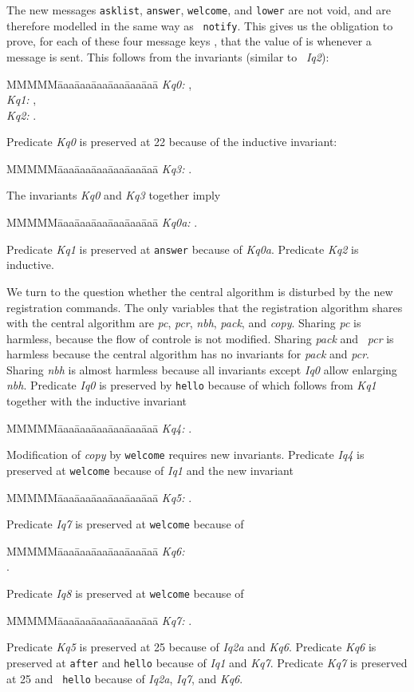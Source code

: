 \documentclass[10pt]{article} \usepackage[english]{babel}
\newenvironment{tab}{\begin{tabbing}
MMMMM\=aaa\=aaa\=aaa\=aaa\=aaa\=aaa\= \kill}{\end{tabbing}}
\def\S #1/{\mbox {\textsl{#1}}}
\def\T #1/{\mbox {\texttt{#1}}}
\begin{document}
The new messages \T asklist/, \T answer/, \T welcome/, and \T lower/
are not void, and are therefore modelled in the same way as \T
notify/.  This gives us the obligation to prove, for each of these
four message keys , that the value of  is  whenever a
message  is sent.  This follows from the invariants (similar to \S
Iq2/):
\begin{tab}
  \S Kq0:/ \>  ,\\
  \S Kq1:/ \>  ,\\
  \S Kq2:/ \>  .
\end{tab}
Predicate \S Kq0/ is preserved at 22 because of the inductive invariant:
\begin{tab}
\S Kq3:/ \>  .
\end{tab}
The invariants \S Kq0/ and \S Kq3/ together imply
\begin{tab}
\S Kq0a:/ \>  .
\end{tab}
Predicate \S Kq1/ is preserved at \T answer/ because of \S Kq0a/.
Predicate \S Kq2/ is inductive.

We turn to the question whether the central algorithm is disturbed by
the new registration commands.  The only variables that the
registration algorithm shares with the central algorithm are \S pc/,
\S pcr/, \S nbh/, \S pack/, and \S copy/.  Sharing \S pc/ is harmless,
because the flow of controle is not modified.  Sharing \S pack/ and \S
pcr/ is harmless because the central algorithm has no invariants for
\S pack/ and \S pcr/.  Sharing \S nbh/ is almost harmless because all
invariants except \S Iq0/ allow enlarging \S nbh/.  Predicate \S Iq0/
is preserved by \T hello/ because of  which follows
from \S Kq1/ together with the inductive invariant
\begin{tab}
  \S Kq4:/ \>  .
\end{tab}

Modification of \S copy/ by \T welcome/ requires new invariants.
Predicate \S Iq4/ is preserved at \T welcome/ because of \S Iq1/ and
the new invariant
\begin{tab}
\S Kq5:/ \>  .
\end{tab}
Predicate \S Iq7/ is preserved at \T welcome/ because of 
\begin{tab}
\S Kq6:/ \>  \\
\>  .
\end{tab}
Predicate \S Iq8/ is preserved at \T welcome/ because of 
\begin{tab}
\S Kq7:/ \>  .
\end{tab}

Predicate \S Kq5/ is preserved at 25 because of \S Iq2a/ and \S Kq6/.
Predicate \S Kq6/ is preserved at \T after/ and \T hello/ because of
\S Iq1/ and \S Kq7/.  Predicate \S Kq7/ is preserved at 25 and \T
hello/ because of \S Iq2a/, \S Iq7/, and \S Kq6/.
\end{document}
